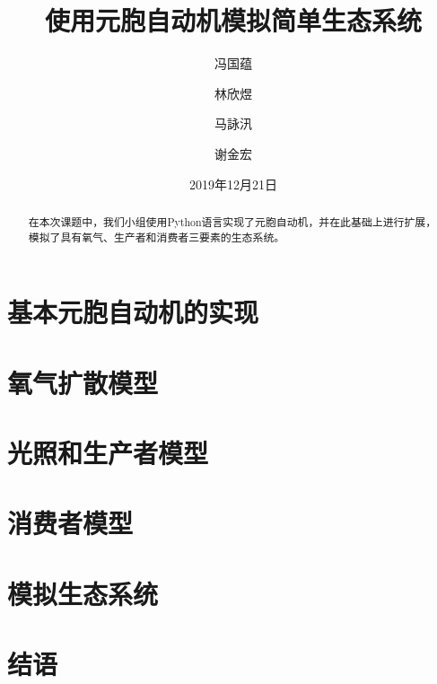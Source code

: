 \documentclass{ctexart}
\author{
	冯国蕴 \and 林欣煜 \and 马詠汛 \and 谢金宏
}
\title{使用元胞自动机模拟简单生态系统}
\date{2019年12月21日}
\begin{document}
\maketitle          

\begin{abstract}
在本次课题中，我们小组使用Python语言实现了元胞自动机，并在此基础上进行扩展，模拟了具有氧气、生产者和消费者三要素的生态系统。
\end{abstract}

\tableofcontents

\section{基本元胞自动机的实现}

\section{氧气扩散模型}

\section{光照和生产者模型}

\section{消费者模型}

\section{模拟生态系统}

\section{结语}
\end{document}
